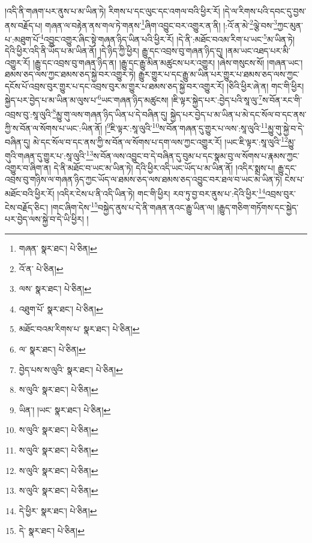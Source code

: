 །འདི་ནི་གཞག་པར་ནུས་པ་མ་ཡིན་ཏེ། རིགས་པ་དང་ལུང་དང་འགལ་བའི་ཕྱིར་རོ། །དེ་ལ་རིགས་པའི་དབང་དུ་བྱས་ནས་བརྗོད་པ། གཞན་ལ་བརྟེན་ནས་གལ་ཏེ་གནས་\footnote{གཞན་  སྣར་ཐང་།  པེ་ཅིན། }ཞིག་འབྱུང་བར་འགྱུར་ན་ནི། །:འོ་ན་མེ་\footnote{འོ་ན་  པེ་ཅིན། }ལྕེ་བས་\footnote{ལས་  སྣར་ཐང་།  པེ་ཅིན། }ཀྱང་མུན་པ་:མཐུག་པོ་\footnote{འཐུག་པོ་  སྣར་ཐང་།  པེ་ཅིན། }འབྱུང་འགྱུར་ཞིང་སྟེ་གཞན་ཉིད་ཡིན་པའི་ཕྱིར་རོ། །དེ་ནི་:མཐོང་བའམ་རིག་པ་ཡང་\footnote{མཐོང་བའམ་རིགས་པ་  སྣར་ཐང་།  པེ་ཅིན། }མ་ཡིན་ཏེ། དེའི་ཕྱིར་འདི་ནི་ཡོད་པ་མ་ཡིན་ནོ། །དེ་ཉིད་ཀྱི་ཕྱིར། རྒྱུ་དང་འབྲས་བུ་གཞན་ཉིད་དུ། །ནམ་ཡང་འཐད་པར་མི་འགྱུར་རོ། །རྒྱུ་དང་འབྲས་བུ་གཞན་ཉིད་ན། །རྒྱུ་དང་རྒྱུ་མིན་མཚུངས་པར་འགྱུར། །ཞེས་གསུངས་སོ། །གཞན་ཡང་། ཐམས་ཅད་ལས་ཀྱང་ཐམས་ཅད་སྐྱེ་བར་འགྱུར་ཏེ། རྒྱུར་གྱུར་པ་དང་རྒྱུ་མ་ཡིན་པར་གྱུར་པ་ཐམས་ཅད་ལས་ཀྱང་དངོས་པོ་འབྲས་བུར་གྱུར་པ་དང་འབྲས་བུར་མ་གྱུར་པ་ཐམས་ཅད་སྐྱེ་བར་འགྱུར་རོ། །ཅིའི་ཕྱིར་ཞེ་ན། གང་གི་ཕྱིར། སྐྱེད་པར་བྱེད་པ་མ་ཡིན་མ་ལུས་པ་\footnote{ལ་  སྣར་ཐང་།  པེ་ཅིན། }ཡང་གཞན་ཉིད་མཚུངས། །ཇི་ལྟར་སྐྱེད་པར་:བྱེད་པའི་སཱ་ལུ་\footnote{བྱེད་པས་ས་ལུའི་  སྣར་ཐང་།  པེ་ཅིན། }ས་བོན་རང་གི་འབྲས་བུ་:སཱ་ལུའི་\footnote{ས་ལུའི་  སྣར་ཐང་།  པེ་ཅིན། }མྱུ་གུ་ལས་གཞན་ཉིད་ཡིན་པ་དེ་བཞིན་དུ། སྐྱེད་པར་བྱེད་པ་མ་ཡིན་པ་མེ་དང་སོལ་བ་དང་ནས་ཀྱི་ས་བོན་ལ་སོགས་པ་ཡང་:ཡིན་ནོ། །\footnote{ཡིན་། །ཡང་  སྣར་ཐང་།  པེ་ཅིན། }ཇི་ལྟར་:སཱ་ལུའི་\footnote{ས་ལུའི་  སྣར་ཐང་།  པེ་ཅིན། }ས་བོན་གཞན་དུ་གྱུར་པ་ལས་:སཱ་ལུའི་\footnote{ས་ལུའི་  སྣར་ཐང་།  པེ་ཅིན། }མྱུ་གུ་སྐྱེ་བ་དེ་བཞིན་དུ། མེ་དང་སོལ་བ་དང་ནས་ཀྱི་ས་བོན་ལ་སོགས་པ་དག་ལས་ཀྱང་འགྱུར་རོ། །ཡང་ཇི་ལྟར་:སཱ་ལུའི་\footnote{ས་ལུའི་  སྣར་ཐང་།  པེ་ཅིན། }མྱུ་གུའི་གཞན་དུ་གྱུར་པ་:སཱ་ལུའི་\footnote{ས་ལུའི་  སྣར་ཐང་།  པེ་ཅིན། }ས་བོན་ལས་འབྱུང་བ་དེ་བཞིན་དུ་བུམ་པ་དང་སྣམ་བུ་ལ་སོགས་པ་རྣམས་ཀྱང་འགྱུར་བ་ཞིག་ན། དེ་ནི་མཐོང་བ་ཡང་མ་ཡིན་ཏེ། དེའི་ཕྱིར་འདི་ཡང་ཡོད་པ་མ་ཡིན་ནོ། །འདིར་སྨྲས་པ། རྒྱུ་དང་འབྲས་བུ་གཉིས་ལ་གཞན་ཉིད་ཀྱང་ཡོད་ལ་ཐམས་ཅད་ལས་ཐམས་ཅད་འབྱུང་བར་ཐལ་བ་ཡང་མ་ཡིན་ཏེ། ངེས་པ་མཐོང་བའི་ཕྱིར་རོ། །འདིར་ངེས་པ་ནི་འདི་ཡིན་ཏེ། གང་གི་ཕྱིར། རབ་ཏུ་བྱ་བར་ནུས་པ་:དེའི་ཕྱིར་\footnote{དེ་ཕྱིར་  སྣར་ཐང་།  པེ་ཅིན། }འབྲས་བུར་ངེས་བརྗོད་ཅིང་། །གང་ཞིག་དེས་\footnote{དེ་  སྣར་ཐང་།  པེ་ཅིན། }བསྐྱེད་ནུས་པ་དེ་ནི་གཞན་ནའང་རྒྱུ་ཡིན་ལ། །རྒྱུད་གཅིག་གཏོགས་དང་སྐྱེད་པར་བྱེད་ལས་སྐྱེ་བ་དེ་ཡི་ཕྱིར། །
